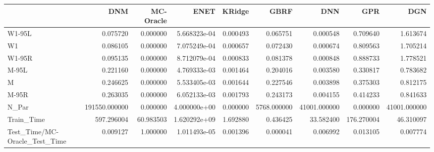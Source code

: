 \begin{tabular}{lrrrrrrrr}
\toprule
{} &            DNM &  MC-Oracle &          ENET &    KRidge &         GBRF &           DNN &         GPR &           DGN \\
\midrule
W1-95L                        &       0.075720 &   0.000000 &  5.668323e-04 &  0.000493 &     0.065751 &      0.000548 &    0.709640 &      1.613674 \\
W1                            &       0.086105 &   0.000000 &  7.075249e-04 &  0.000657 &     0.072430 &      0.000674 &    0.809563 &      1.705214 \\
W1-95R                        &       0.095135 &   0.000000 &  8.712079e-04 &  0.000833 &     0.081378 &      0.000848 &    0.888733 &      1.778521 \\
M-95L                         &       0.221160 &   0.000000 &  4.769333e-03 &  0.001464 &     0.204016 &      0.003580 &    0.330817 &      0.783682 \\
M                             &       0.246625 &   0.000000 &  5.533405e-03 &  0.001644 &     0.227546 &      0.003898 &    0.375303 &      0.812175 \\
M-95R                         &       0.263035 &   0.000000 &  6.052133e-03 &  0.001793 &     0.243173 &      0.004155 &    0.414233 &      0.841633 \\
N\_Par                         &  191550.000000 &   0.000000 &  4.000000e+00 &  0.000000 &  5768.000000 &  41001.000000 &    0.000000 &  41001.000000 \\
Train\_Time                    &     597.296004 &  60.983503 &  1.620292e+09 &  1.692880 &     0.436425 &     33.582400 &  176.270004 &     46.310097 \\
Test\_Time/MC-Oracle\_Test\_Time &       0.009127 &   1.000000 &  1.011493e-05 &  0.001396 &     0.000041 &      0.006992 &    0.013105 &      0.007774 \\
\bottomrule
\end{tabular}
